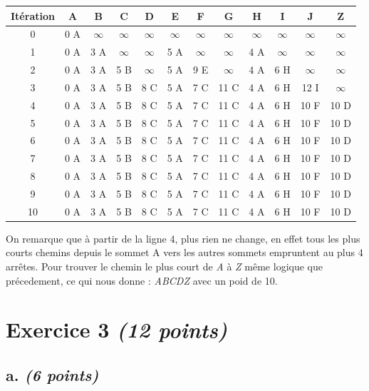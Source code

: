 \documentclass{article}
\begin{document}
\hfill

\begin{tabular}{|c|c|c|c|c|c|c|c|c|c|c|c|}
	\hline
	Itération & A & B & C & D & E & F & G & H & I & J & Z\\
	\hline
	0 & 0 A & $\infty$ & $\infty$ & $\infty$ & $\infty$ & $\infty$ & $\infty$ & $\infty$ & $\infty$ & $\infty$ & $\infty$\\
	\hline 
	1 & 0 A & 3 A & $\infty$ & $\infty$ & 5 A & $\infty$ & $\infty$ & 4 A & $\infty$ & $\infty$ & $\infty$\\
	\hline
	2 & 0 A & 3 A & 5 B & $\infty$ & 5 A & 9 E & $\infty$ & 4 A & 6 H & $\infty$ & $\infty$\\
	\hline
	3 & 0 A & 3 A & 5 B & 8 C & 5 A & 7 C & 11 C & 4 A & 6 H & 12 I & $\infty$\\
	\hline
	4 & 0 A & 3 A & 5 B & 8 C & 5 A & 7 C & 11 C & 4 A & 6 H & 10 F & 10 D\\
	\hline
	5 & 0 A & 3 A & 5 B & 8 C & 5 A & 7 C & 11 C & 4 A & 6 H & 10 F & 10 D\\
	\hline
	6 & 0 A & 3 A & 5 B & 8 C & 5 A & 7 C & 11 C & 4 A & 6 H & 10 F & 10 D\\
	\hline
	7 & 0 A & 3 A & 5 B & 8 C & 5 A & 7 C & 11 C & 4 A & 6 H & 10 F & 10 D\\
	\hline
	8 & 0 A & 3 A & 5 B & 8 C & 5 A & 7 C & 11 C & 4 A & 6 H & 10 F & 10 D\\
	\hline
	9 & 0 A & 3 A & 5 B & 8 C & 5 A & 7 C & 11 C & 4 A & 6 H & 10 F & 10 D\\
	\hline
	10 & 0 A & 3 A & 5 B & 8 C & 5 A & 7 C & 11 C & 4 A & 6 H & 10 F & 10 D\\
	\hline
\end{tabular}

\hfill

\hfill

On remarque que à partir de la ligne 4, plus rien ne change, en effet tous les plus courts chemins depuis le sommet A vers les autres sommets empruntent au plus 4 arrêtes. Pour trouver le chemin le plus court de \emph{A} à \emph{Z} même logique que précedement, ce qui nous donne : \emph{ABCDZ} avec un poid de 10.


\clearpage

\section{Exercice 3 \emph{(12 points)}}

\subsection{a. \emph{(6 points)}} %
\end{document}
